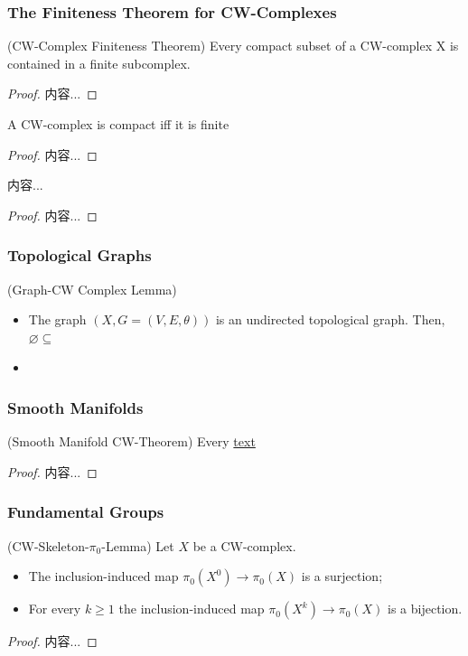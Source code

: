 \documentclass[Total.tex]{subfiles}
\begin{document}
		\subsubsection{The Finiteness Theorem for CW-Complexes}
			\begin{theorem}
				(CW-Complex Finiteness Theorem) Every compact subset of a CW-complex X is contained in a finite subcomplex.
			\end{theorem}
			\begin{proof}
				内容...
			\end{proof}
			\begin{corollary}
				A CW-complex is compact iff it is finite
			\end{corollary}
			\begin{proof}
				内容...
			\end{proof}
			
				\begin{lemma}
					内容...
				\end{lemma}
				\begin{proof}
					内容...
				\end{proof}
		\subsubsection{Topological Graphs}
		\begin{lemma}
			(Graph-CW Complex Lemma)
			\begin{itemize}
				\item The graph $(X,G=(V,E,\theta))$ is an undirected topological graph. Then, $\varnothing\subseteq$
				\item 
			\end{itemize}
		\end{lemma}
		\subsubsection{Smooth Manifolds}
		\begin{theorem}
			(Smooth Manifold CW-Theorem) Every \underline{text}
		\end{theorem}
		\begin{proof}
			内容...
		\end{proof}
		
		
		\subsubsection{Fundamental Groups}
			\begin{lemma}
				(CW-Skeleton-$\pi_0$-Lemma)
				Let $X$ be a CW-complex.
				\begin{itemize}
					\item The inclusion-induced map $\pi_0(X^0)\rightarrow \pi_0(X)$ is a surjection;
					\item For every $k\geq 1$ the inclusion-induced map $\pi_0(X^k)\rightarrow \pi_0(X)$ is a bijection.
				\end{itemize}
			\end{lemma}
			\begin{proof}
				内容...
			\end{proof}
\end{document}
